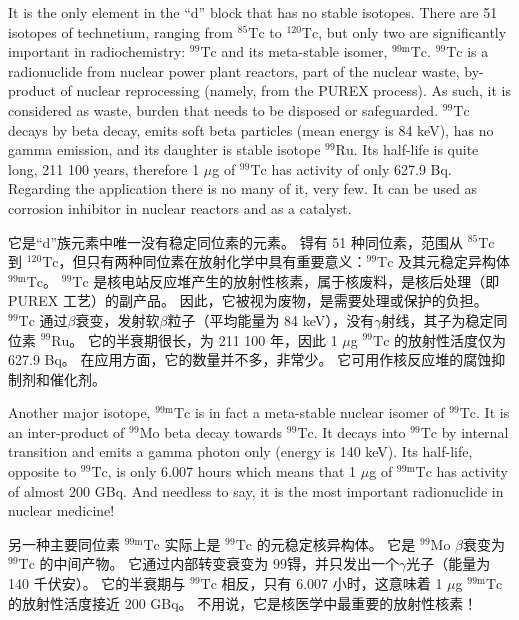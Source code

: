 \documentclass[dvipsnames, svgnames,a4paper,11pt]{article}
\begin{document}
It is the only element in the “d” block that has no stable isotopes. There are 51
isotopes of technetium, ranging from $\mathrm{{}^{85}Tc}$ to $\mathrm{{}^{120}Tc}$, but only two are significantly
important in radiochemistry: $\mathrm{{}^{99}Tc}$ and its meta-stable isomer, ${}^\mathrm{99m}\mathrm{Tc}$. $\mathrm{{}^{99}Tc}$ is a
radionuclide from nuclear power plant reactors, part of the nuclear waste, by-product
of nuclear reprocessing (namely, from the PUREX process). As such, it is
considered as waste, burden that needs to be disposed or safeguarded. $\mathrm{{}^{99}Tc}$ decays
by beta decay, emits soft beta particles (mean energy is 84 keV), has no gamma
emission, and its daughter is stable isotope $\mathrm{{}^{99}Ru}$. Its half-life is quite long, 211 100
years, therefore 1 $\mu$g of $\mathrm{{}^{99}Tc}$ has activity of only 627.9 Bq. Regarding the application
there is no many of it, very few. It can be used as corrosion inhibitor in nuclear
reactors and as a catalyst.

它是“d”族元素中唯一没有稳定同位素的元素。 锝有 51 种同位素，范围从 $\mathrm{{}^{85}Tc}$ 到 $\mathrm{{}^{120}Tc}$，但只有两种同位素在放射化学中具有重要意义：$\mathrm{{}^{99}Tc}$ 及其元稳定异构体 ${}^\mathrm{99m}\mathrm{Tc}$。 $\mathrm{{}^{99}Tc}$ 是核电站反应堆产生的放射性核素，属于核废料，是核后处理（即 PUREX 工艺）的副产品。 因此，它被视为废物，是需要处理或保护的负担。 $\mathrm{{}^{99}Tc}$ 通过$\beta$衰变，发射软$\beta$粒子（平均能量为 84 keV），没有$\gamma$射线，其子为稳定同位素 $\mathrm{{}^{99}Ru}$。 它的半衰期很长，为 211 100 年，因此 1 $\mu$g $\mathrm{{}^{99}Tc}$ 的放射性活度仅为 627.9 Bq。 在应用方面，它的数量并不多，非常少。 它可用作核反应堆的腐蚀抑制剂和催化剂。

Another major isotope, ${}^\mathrm{99m}\mathrm{Tc}$ is in fact a meta-stable nuclear isomer of $\mathrm{{}^{99}Tc}$. It is an
inter-product of ${}^\mathrm{99}\mathrm{Mo}$ beta decay towards $\mathrm{{}^{99}Tc}$. It decays into $\mathrm{{}^{99}Tc}$ by internal
transition and emits a gamma photon only (energy is 140 keV). Its half-life, opposite
to $\mathrm{{}^{99}Tc}$, is only 6.007 hours which means that 1 $\mu$g of ${}^\mathrm{99m}\mathrm{Tc}$ has activity of almost 200
GBq. And needless to say, it is the most important radionuclide in nuclear medicine!

另一种主要同位素 ${}^\mathrm{99m}\mathrm{Tc}$ 实际上是 $\mathrm{{}^{99}Tc}$ 的元稳定核异构体。 它是 ${}^\mathrm{99}\mathrm{Mo}$ $\beta$衰变为 $\mathrm{{}^{99}Tc}$ 的中间产物。 它通过内部转变衰变为 99锝，并只发出一个$\gamma$光子（能量为 140 千伏安）。 它的半衰期与 $\mathrm{{}^{99}Tc}$ 相反，只有 6.007 小时，这意味着 1 $\mu$g ${}^\mathrm{99m}\mathrm{Tc}$ 的放射性活度接近 200 GBq。 不用说，它是核医学中最重要的放射性核素！
\end{document}
